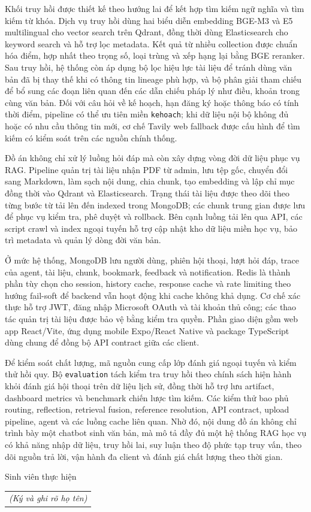 \documentclass[../DoAn.tex]{subfiles}
\begin{document}
Khối truy hồi được thiết kế theo hướng lai để kết hợp tìm kiếm ngữ nghĩa và tìm
kiếm từ khóa. Dịch vụ truy hồi dùng hai biểu diễn embedding BGE-M3 và E5
multilingual cho vector search trên Qdrant, đồng thời dùng Elasticsearch cho
keyword search và hỗ trợ lọc metadata. Kết quả từ nhiều collection được chuẩn
hóa điểm, hợp nhất theo trọng số, loại trùng và xếp hạng lại bằng BGE reranker.
Sau truy hồi, hệ thống còn áp dụng bộ lọc hiệu lực tài liệu để tránh dùng văn
bản đã bị thay thế khi có thông tin lineage phù hợp, và bộ phân giải tham chiếu
để bổ sung các đoạn liên quan đến các dẫn chiếu pháp lý như điều, khoản trong
cùng văn bản. Đối với câu hỏi về kế hoạch, hạn đăng ký hoặc thông báo có tính
thời điểm, pipeline có thể ưu tiên miền \texttt{kehoach}; khi dữ liệu nội bộ
không đủ hoặc có nhu cầu thông tin mới, cơ chế Tavily web fallback được cấu hình
để tìm kiếm có kiểm soát trên các nguồn chính thống.

Đồ án không chỉ xử lý luồng hỏi đáp mà còn xây dựng vòng đời dữ liệu phục vụ RAG.
Pipeline quản trị tài liệu nhận PDF từ admin, lưu tệp gốc, chuyển đổi sang
Markdown, làm sạch nội dung, chia chunk, tạo embedding và lập chỉ mục đồng thời
vào Qdrant và Elasticsearch. Trạng thái tài liệu được theo dõi theo từng bước
từ tải lên đến indexed trong MongoDB; các chunk trung gian được lưu để phục vụ
kiểm tra, phê duyệt và rollback. Bên cạnh luồng tải lên qua API, các script crawl
và index ngoại tuyến hỗ trợ cập nhật kho dữ liệu miền học vụ, bảo trì metadata và
quản lý dòng đời văn bản.

Ở mức hệ thống, MongoDB lưu người dùng, phiên hội thoại, lượt hỏi đáp, trace của
agent, tài liệu, chunk, bookmark, feedback và notification. Redis là thành phần
tùy chọn cho session, history cache, response cache và rate limiting theo hướng
fail-soft để backend vẫn hoạt động khi cache không khả dụng. Cơ chế xác thực hỗ
trợ JWT, đăng nhập Microsoft OAuth và tài khoản thủ công; các thao tác quản trị
tài liệu được bảo vệ bằng kiểm tra quyền. Phần giao diện gồm web app React/Vite,
ứng dụng mobile Expo/React Native và package TypeScript dùng chung để đồng bộ
API contract giữa các client.

Để kiểm soát chất lượng, mã nguồn cung cấp lớp đánh giá ngoại tuyến và kiểm thử
hồi quy. Bộ \texttt{evaluation} tách kiểm tra truy hồi theo chính sách hiện hành
khỏi đánh giá hội thoại trên dữ liệu lịch sử, đồng thời hỗ trợ lưu artifact,
dashboard metrics và benchmark chiến lược tìm kiếm. Các kiểm thử bao phủ routing,
reflection, retrieval fusion, reference resolution, API contract, upload
pipeline, agent và các luồng cache liên quan. Nhờ đó, nội dung đồ án không chỉ
trình bày một chatbot sinh văn bản, mà mô tả đầy đủ một hệ thống RAG học vụ có
khả năng nhập dữ liệu, truy hồi lai, suy luận theo độ phức tạp truy vấn, theo dõi
nguồn trả lời, vận hành đa client và đánh giá chất lượng theo thời gian.

\begin{flushright}
Sinh viên thực hiện\\
\begin{tabular}{@{}c@{}}
\textit{(Ký và ghi rõ họ tên)}
\end{tabular}
\end{flushright}
\end{document}
